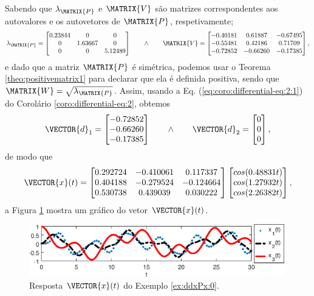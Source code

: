 \newpage
\begin{SolutionT}
\label{ex:ddxPx:0:sol1}
Sabendo que $\lambda_{\MATRIX{P}}$ e $\MATRIX{V}$ são matrizes correspondentes 
aos autovalores e os autovetores de $\MATRIX{P}$,
respetivamente; 
\begin{equation}
\lambda_{\MATRIX{P}}=
\begin{bmatrix}
   0.23844 &       0 &       0\\
         0 & 1.63667 &       0\\
         0 &       0 & 5.12489
\end{bmatrix}
\qquad \wedge \qquad
\MATRIX{V}=
\begin{bmatrix}
  -0.40181 & 0.61887 &-0.67495\\
  -0.55481 & 0.42186 & 0.71709\\
  -0.72852 &-0.66260 &-0.17385
\end{bmatrix},
\end{equation}
e dado que a matriz $\MATRIX{P}$ é simétrica, podemos usar o Teorema \ref{theo:positivematrix1}
para declarar que ela é definida positiva, 
sendo que $\MATRIX{W}=\sqrt{\lambda_{\MATRIX{P}}}$.
Assim, usando a Eq. (\ref{eq:coro:differential-eq:2:1}) do Corolário \ref{coro:differential-eq:2},
obtemos
\begin{equation}
\VECTOR{d}_1=
\begin{bmatrix}
  -0.72852\\
  -0.66260\\
  -0.17385
\end{bmatrix}
\qquad \wedge \qquad
\VECTOR{d}_2=
\begin{bmatrix}
   0\\
   0\\
   0
\end{bmatrix},
\end{equation}
de modo que 
\begin{equation}
 \VECTOR{x}(t)= 
\begin{bmatrix}
   0.292724 &-0.410061 & 0.117337\\
   0.404188 &-0.279524 &-0.124664\\
   0.530738 & 0.439039 & 0.030222
\end{bmatrix}
\begin{bmatrix}
   cos(0.48831 t)\\
   cos(1.27932 t)\\
   cos(2.26382 t)
\end{bmatrix},
\end{equation}
a Figura \ref{fig:ex:ddxPx:0} mostra um gráfico do vetor $\VECTOR{x}(t)$.
\end{SolutionT}
     \begin{figure}[!h]
         \centering
         \includegraphics[width=0.99\textwidth]{chapters/differential-eq/mfiles/segundoorder/segundoroder1.eps}
         \caption{Resposta $\VECTOR{x}(t)$ do Exemplo \ref{ex:ddxPx:0}.}
         \label{fig:ex:ddxPx:0}
     \end{figure}
